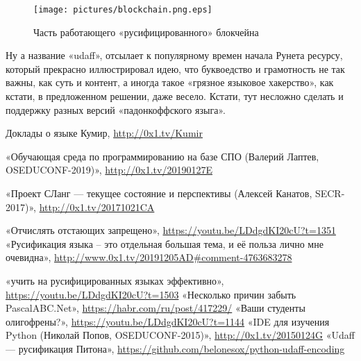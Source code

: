 ﻿\documentclass[a4paper,12pt]{article}
\begin{document}
\begin{figure}
\centering
\texttt{[image: pictures/blockchain.png.eps]}
\caption{Часть работающего «русифицированного» блокчейна}
\end{figure}


Ну а название «udaff», отсылает к популярному времен начала Рунета
ресурсу, который прекрасно иллюстрировал идею, что буквоедство и
грамотность не так важны, как суть и контент, а иногда такое «грязное
языковое хакерство», как кстати, в предложенном решении, даже весело.
Кстати, тут несложно сделать и поддержку разных версий «падонкоффского
языга».

\begin{thebibliography}{9}
     Доклады о языке Кумир, \url{http://0x1.tv/Kumir}

     «Обучающая среда по программированию на базе СПО (Валерий Лаптев, OSEDUCONF-2019)», \url{http://0x1.tv/20190127E}

     «Проект СЛанг — текущее состояние и перспективы (Алексей Канатов, SECR-2017)», \url{http://0x1.tv/20171021CA}

     «Отчислять отстающих запрещено», \url{https://youtu.be/LDdgdKI20cU?t=1351}
     «Русификация языка -- это отдельная большая тема, и её польза лично мне очевидна», \url{http://www.0x1.tv/20191205AD#comment-4763683278}

     «учить на русифицированных
    языках эффективно», \url{https://youtu.be/LDdgdKI20cU?t=1503}
     «Несколько причин забыть PascalABC.Net», \url{https://habr.com/ru/post/417229/}
     «Ваши студенты олигофрены?», \url{https://youtu.be/LDdgdKI20cU?t=1144}
     «IDE для изучения Python (Николай Попов, OSEDUCONF-2015)», \url{http://0x1.tv/20150124G}
     «Udaff — русификация Питона», \url{https://github.com/belonesox/python-udaff-encoding}
\end{thebibliography}
\end{document}
